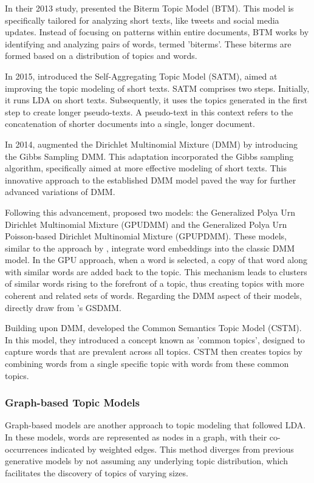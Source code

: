 \documentclass{article}
\begin{document}
In their 2013 study, \citet{yan_biterm_2013} presented the Biterm Topic Model (BTM). This model is specifically tailored for analyzing short texts, like tweets and social media updates. Instead of focusing on patterns within entire documents, BTM works by identifying and analyzing pairs of words, termed 'biterms'. These biterms are formed based on a distribution of topics and words.

In 2015, \citet{quan_short_2015} introduced the Self-Aggregating Topic Model (SATM), aimed at improving the topic modeling of short texts. SATM comprises two steps. Initially, it runs LDA on short texts. Subsequently, it uses the topics generated in the first step to create longer pseudo-texts. A pseudo-text in this context refers to the concatenation of shorter documents into a single, longer document.

In 2014, \citet{yin_dirichlet_2014} augmented the Dirichlet Multinomial Mixture (DMM) by introducing the Gibbs Sampling DMM. This adaptation incorporated the Gibbs sampling algorithm, specifically aimed at more effective modeling of short texts. This innovative approach to the established DMM model paved the way for further advanced variations of DMM.

Following this advancement, \citet{li_topic_2016} proposed two models: the Generalized Polya Urn Dirichlet Multinomial Mixture (GPUDMM) and the Generalized Polya Urn Poisson-based Dirichlet Multinomial Mixture (GPUPDMM). These models, similar to the approach by \citet{nguyen_improving_2015}, integrate word embeddings into the classic DMM model. In the GPU approach, when a word is selected, a copy of that word along with similar words are added back to the topic. This mechanism leads to clusters of similar words rising to the forefront of a topic, thus creating topics with more coherent and related sets of words. Regarding the DMM aspect of their models, \citeauthor{li_topic_2016} directly draw from \citet{yin_dirichlet_2014}'s GSDMM.

Building upon DMM, \citet{li_filtering_2018} developed the Common Semantics Topic Model (CSTM). In this model, they introduced a concept known as 'common topics', designed to capture words that are prevalent across all topics. CSTM then creates topics by combining words from a single specific topic with words from these common topics.

\subsubsection{Graph-based Topic Models}
Graph-based models are another approach to topic modeling that followed LDA. In these models, words are represented as nodes in a graph, with their co-occurrences indicated by weighted edges. This method diverges from previous generative models by not assuming any underlying topic distribution, which facilitates the discovery of topics of varying sizes.
\end{document}
